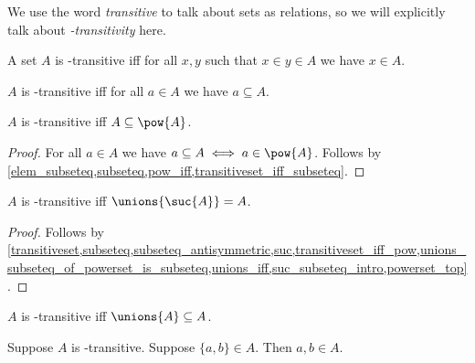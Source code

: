 We use the word \emph{transitive} to talk about sets as relations,
so we will explicitly talk about \emph{\in-transitivity} here.

%
%
\begin{definition}\label{transitiveset}
    A set $A$ is \in-transitive iff for all $x, y$
    such that $x\in y\in A$ we have $x\in A$.
\end{definition}

\begin{proposition}\label{transitiveset_iff_subseteq}
    $A$ is \in-transitive iff
    for all $a\in A$ we have $a\subseteq A$.
\end{proposition}

\begin{proposition}\label{transitiveset_iff_pow}
    $A$ is \in-transitive iff $A\subseteq \pow{A}$.
\end{proposition}
\begin{proof}
    For all $a\in A$ we have $a\subseteq A \iff a\in\pow{A}$.
    Follows by \cref{elem_subseteq,subseteq,pow_iff,transitiveset_iff_subseteq}.
\end{proof}

\begin{proposition}\label{transitiveset_iff_unions_suc}
    $A$ is \in-transitive iff $\unions{\suc{A}} = A$.
\end{proposition}
\begin{proof}
    Follows by \cref{transitiveset,subseteq,subseteq_antisymmetric,suc,transitiveset_iff_pow,unions_subseteq_of_powerset_is_subseteq,unions_iff,suc_subseteq_intro,powerset_top}.
\end{proof}

\begin{proposition}\label{transitiveset_iff_unions_subseteq}
    $A$ is \in-transitive iff $\unions{A}\subseteq A$.
\end{proposition}

\begin{proposition}\label{transitiveset_upair}
    Suppose $A$ is \in-transitive.
    Suppose $\{a,b\}\in A$.
    Then $a,b\in A$.
\end{proposition}


